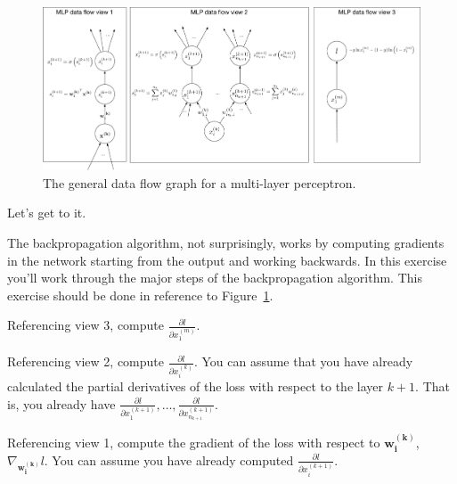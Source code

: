 \documentclass[assignment06_Solutions]{subfiles}
\begin{document}
\begin{figure}
\begin{center}
\includegraphics[width=\linewidth]{figures/mlpfull}
\end{center}
\caption{The general data flow graph for a multi-layer perceptron.\label{fig:mlpgeneral}}
\end{figure}

Let's get to it.

\newpage
\begin{exercise}[(60 minutes)]
The backpropagation algorithm, not surprisingly, works by computing gradients in the network starting from the output and working backwards.  In this exercise you'll work through the major steps of the backpropagation algorithm.  This exercise should be done in reference to Figure~\ref{fig:mlpgeneral}.
\bes
\item Referencing view 3, compute $\frac{\partial l}{\partial x^{(m)}_1}$.
\item Referencing view 2, compute $\frac{\partial l}{\partial x^{(k)}_i}$.  You can assume that you have already calculated the partial derivatives of the loss with respect to the layer $k+1$.  That is, you already have $\frac{\partial l}{\partial x^{(k+1)}_1}, \ldots, \frac{\partial l}{\partial x^{(k+1)}_{n_{k+1}}}$.
\item Referencing view 1, compute the gradient of the loss with respect to $\mathbf{w^{(k)}_i}$, $\nabla_{\mathbf{w^{(k)}_i}} l$.  You can assume you have already computed $\frac{\partial l}{\partial x^{(k+1)}_i}$.
\ees
\end{exercise}
\end{document}
